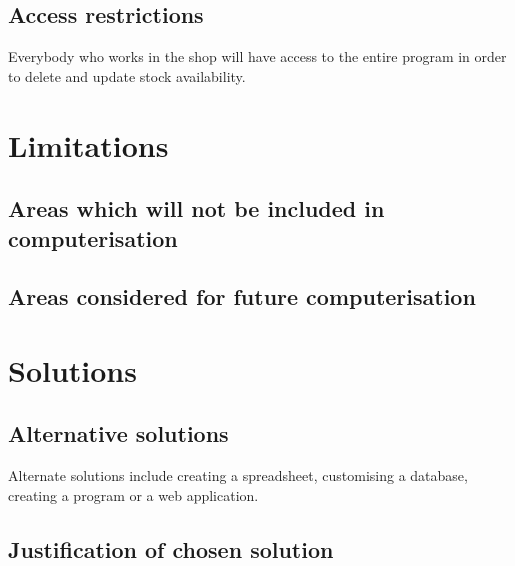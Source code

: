 \subsection{Access restrictions}
Everybody who works in the shop will have access to the entire program in order to delete and update stock availability. 
\section{Limitations}

\subsection{Areas which will not be included in computerisation}

\subsection{Areas considered for future computerisation}

\section{Solutions}

\subsection{Alternative solutions}
Alternate solutions include creating a spreadsheet, customising a database, creating a program or a web application. 
\subsection{Justification of chosen solution}
